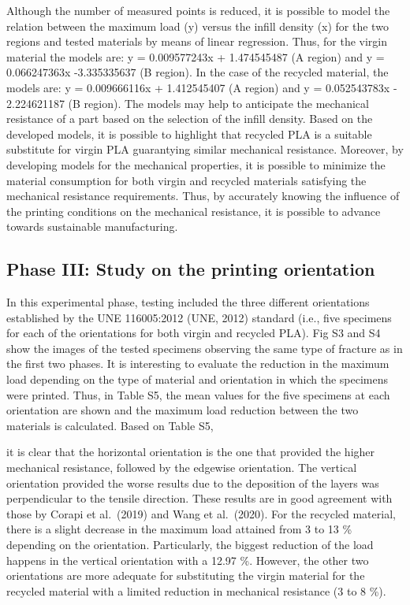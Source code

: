 \documentclass[]{elsarticle} %
\begin{document}
Although the number of measured points is reduced, it is possible to
model the relation between the maximum load (y) versus the infill
density (x) for the two regions and tested materials by means of linear
regression. Thus, for the virgin material the models are: y =
0.009577243x + 1.474545487 (A region) and y = 0.066247363x -3.335335637
(B region). In the case of the recycled material, the models are: y =
0.009666116x + 1.412545407 (A region) and y = 0.052543783x - 2.224621187
(B region). The models may help to anticipate the mechanical resistance
of a part based on the selection of the infill density. Based on the
developed models, it is possible to highlight that recycled PLA is a
suitable substitute for virgin PLA guarantying similar mechanical
resistance. Moreover, by developing models for the mechanical
properties, it is possible to minimize the material consumption for both
virgin and recycled materials satisfying the mechanical resistance
requirements. Thus, by accurately knowing the influence of the printing
conditions on the mechanical resistance, it is possible to advance
towards sustainable manufacturing.

\hypertarget{phase-iii-study-on-the-printing-orientation}{%
\subsection{Phase III: Study on the printing
orientation}\label{phase-iii-study-on-the-printing-orientation}}

In this experimental phase, testing included the three different
orientations established by the UNE 116005:2012 (UNE, 2012) standard
(i.e., five specimens for each of the orientations for both virgin and
recycled PLA). Fig S3 and S4 show the images of the tested specimens
observing the same type of fracture as in the first two phases. It is
interesting to evaluate the reduction in the maximum load depending on
the type of material and orientation in which the specimens were
printed. Thus, in Table S5, the mean values for the five specimens at
each orientation are shown and the maximum load reduction between the
two materials is calculated. Based on Table S5,

it is clear that the horizontal orientation is the one that provided the
higher mechanical resistance, followed by the edgewise orientation. The
vertical orientation provided the worse results due to the deposition of
the layers was perpendicular to the tensile direction. These results are
in good agreement with those by Corapi et al.~(2019) and Wang et
al.~(2020). For the recycled material, there is a slight decrease in the
maximum load attained from 3 to 13 \% depending on the orientation.
Particularly, the biggest reduction of the load happens in the vertical
orientation with a 12.97 \%. However, the other two orientations are
more adequate for substituting the virgin material for the recycled
material with a limited reduction in mechanical resistance (3 to 8 \%).
\end{document}
